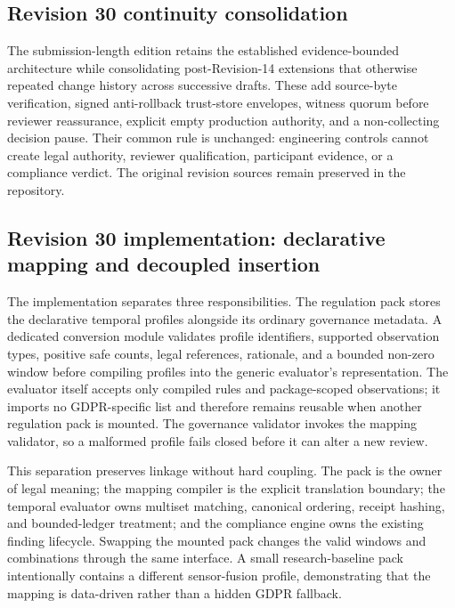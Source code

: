 

\subsection{Revision 30 continuity consolidation}

The submission-length edition retains the established evidence-bounded architecture while consolidating post-Revision-14 extensions that otherwise repeated change history across successive drafts. These add source-byte verification, signed anti-rollback trust-store envelopes, witness quorum before reviewer reassurance, explicit empty production authority, and a non-collecting decision pause. Their common rule is unchanged: engineering controls cannot create legal authority, reviewer qualification, participant evidence, or a compliance verdict. The original revision sources remain preserved in the repository.

\subsection{Revision 30 implementation: declarative mapping and decoupled insertion}

The implementation separates three responsibilities. The regulation pack stores the declarative temporal profiles alongside its ordinary governance metadata. A dedicated conversion module validates profile identifiers, supported observation types, positive safe counts, legal references, rationale, and a bounded non-zero window before compiling profiles into the generic evaluator's representation. The evaluator itself accepts only compiled rules and package-scoped observations; it imports no GDPR-specific list and therefore remains reusable when another regulation pack is mounted. The governance validator invokes the mapping validator, so a malformed profile fails closed before it can alter a new review.

This separation preserves linkage without hard coupling. The pack is the owner of legal meaning; the mapping compiler is the explicit translation boundary; the temporal evaluator owns multiset matching, canonical ordering, receipt hashing, and bounded-ledger treatment; and the compliance engine owns the existing finding lifecycle. Swapping the mounted pack changes the valid windows and combinations through the same interface. A small research-baseline pack intentionally contains a different sensor-fusion profile, demonstrating that the mapping is data-driven rather than a hidden GDPR fallback.

